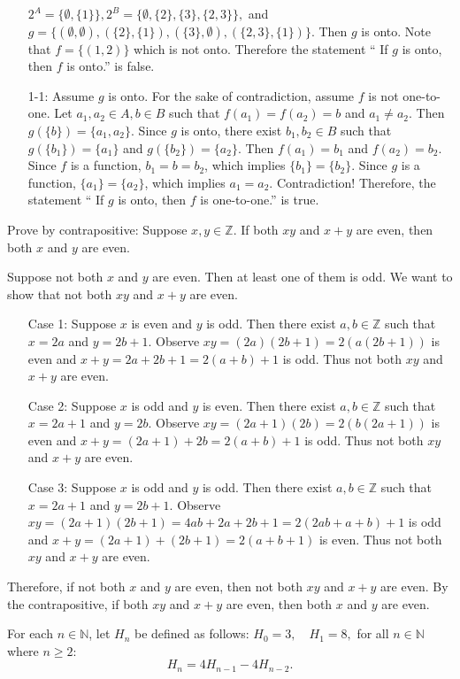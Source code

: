 \documentclass[10pt, addpoints]{exam}
\theoremstyle{definition}
\newcommand{\Z}{\mathbb{Z}}
\newcommand{\N}{\mathbb{N}}
\begin{document}
\begin{questions}
\begin{parts}
\begin{solution}
\begin{itemize}
$ 2^A=\{\emptyset, \{1\}\}, 2^B = \{\emptyset, \{2\}, \{3\}, \{2, 3\}\},$ and $g= \{(\emptyset, \emptyset), (\{2\}, \{1\}), (\{3\}, \emptyset), (\{2, 3\}, \{1\})\}$. Then $g$ is onto. Note that $f=\{(1, 2)\}$ which is not onto. Therefore the statement `` If $g$ is onto, then $f$ is onto.'' is false.

\item[1-1:] Assume $g$ is onto. For the sake of contradiction, assume $f$ is not one-to-one. Let $a_1, a_2\in A, b\in B$ such that $f(a_1)=f(a_2)=b$ and $a_1\neq a_2$. Then $g(\{b\})=\{a_1, a_2\}$. Since $g$ is onto, there exist $b_1, b_2\in B$ such that $g(\{b_1\})=\{a_1\}$ and $g(\{b_2\})=\{a_2\}$. Then $f(a_1)=b_1$ and $f(a_2)=b_2$. Since $f$ is a function, $b_1=b=b_2$, which implies $\{b_1\}=\{b_2\}$. Since $g$ is a function, $\{a_1\}=\{a_2\}$, which implies $a_1=a_2$. Contradiction! Therefore, the statement `` If $g$ is onto, then $f$ is one-to-one.'' is true.
\end{itemize}
\end{solution}
\vfill
\vfill
\vfill
\vfill
\end{parts}

\newpage
\question[8] Prove by contrapositive: Suppose $x,y\in \Z$. If both $xy$ and $x+y$ are even, then both $x$ and $y$ are even.

\begin{solution}
	Suppose not both $x$ and $y$ are even. Then at least one of them is odd. We want to show that not both $xy$ and $x+y$ are even. 
	\begin{itemize}
	\item[Case 1:] Suppose $x$ is even and $y$ is odd. Then there exist $a,b\in \Z$ such that $x=2a$ and $y=2b+1$. Observe $xy=(2a)(2b+1) = 2(a(2b+1))$ is even and $x+y = 2a+2b+1 = 2(a+b)+1$ is odd. Thus not both $xy$ and $x+y$ are even.
	\item[Case 2:] Suppose $x$ is odd and $y$ is even. Then there exist $a, b\in \Z$ such that $x=2a+1$ and $y=2b$. Observe $xy = (2a+1)(2b)= 2(b(2a+1))$ is even and $x+y = (2a+1) + 2b = 2(a+b)+1$ is odd. Thus not both $xy$ and $x+y$ are even.
	\item[Case 3:] Suppose $x$ is odd and $y$ is odd. Then there exist $a, b\in \Z$ such that $x=2a+1$ and $y=2b+1$. Observe $xy = (2a+1)(2b+1)= 4ab+2a+2b+1 = 2(2ab+a+b)+1$ is odd and $x+y = (2a+1) + (2b+1) = 2(a+b+1)$ is even. Thus not both $xy$ and $x+y$ are even.
	\end{itemize}
	Therefore, if not both $x$ and $y$ are even, then not both $xy$ and $x+y$ are even. By the contrapositive, if both $xy$ and $x+y$ are even, then both $x$ and $y$ are even.
\end{solution}
\newpage
\question[10] For each $n\in \N$, let $H_n$ be defined as follows: 
$H_0=3, \quad H_1=8,$ for all $n\in \N$ where $n\geq 2$:
\[ H_n=4H_{n-1}-4H_{n-2}.\]


\end{questions}
\end{document}
